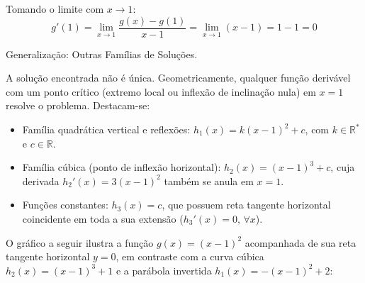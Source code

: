 Tomando o limite com $x \to 1$:
\begin{equation}
g'(1) = \lim_{x \to 1} \frac{g(x) - g(1)}{x - 1} = \lim_{x \to 1}(x - 1) = 1 - 1 = 0
\end{equation}

\vspace{0.3cm}
Generalização: Outras Famílias de Soluções.

A solução encontrada não é única. Geometricamente, qualquer função derivável com um ponto crítico (extremo local ou inflexão de inclinação nula) em $x = 1$ resolve o problema. Destacam-se:
\begin{itemize}[noitemsep, topsep=2pt]
    \item Família quadrática vertical e reflexões: $h_1(x) = k(x - 1)^2 + c$, com $k \in \mathbb{R}^*$ e $c \in \mathbb{R}$.
    \item Família cúbica (ponto de inflexão horizontal): $h_2(x) = (x - 1)^3 + c$, cuja derivada $h_2'(x) = 3(x - 1)^2$ também se anula em $x = 1$.
    \item Funções constantes: $h_3(x) = c$, que possuem reta tangente horizontal coincidente em toda a sua extensão ($h_3'(x) = 0, \, \forall x$).
\end{itemize}

O gráfico a seguir ilustra a função $g(x) = (x - 1)^2$ acompanhada de sua reta tangente horizontal $y = 0$, em contraste com a curva cúbica $h_2(x) = (x - 1)^3 + 1$ e a parábola invertida $h_1(x) = -(x - 1)^2 + 2$:

